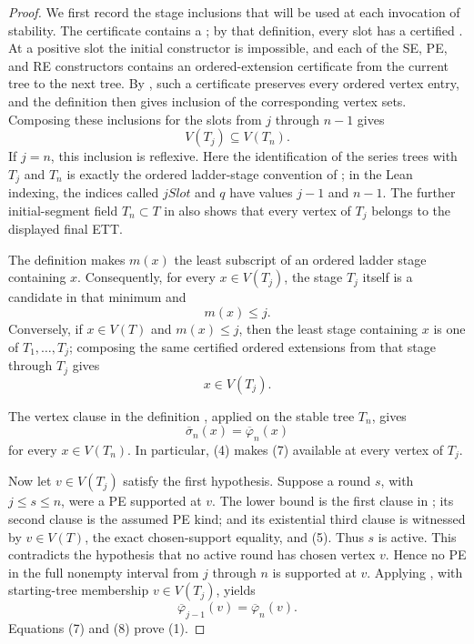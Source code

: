 \begin{proof}
We first record the stage inclusions that will be used at each invocation
of stability.  The certificate  contains a
; by that definition, every slot has a certified
.  At a positive slot the initial constructor
is impossible, and each of the SE, PE, and RE constructors contains an
ordered-extension certificate from the current tree to the next tree.
By , such a certificate preserves every
ordered vertex entry, and the definition 
then gives inclusion of the corresponding vertex sets.  Composing these
inclusions for the slots from \(j\) through \(n-1\) gives
\[
                         V(T_j)\subseteq V(T_n).                \tag{4}
\]
If \(j=n\), this inclusion is reflexive.  Here the identification of the
series trees with \(T_j\) and \(T_n\) is exactly the ordered ladder-stage
convention of ; in the Lean indexing,
the indices called \(jSlot\) and \(q\) have values \(j-1\) and \(n-1\).
The further initial-segment field \(T_n\subset T\) in
 also shows that every vertex of \(T_j\)
belongs to the displayed final ETT.

The definition  makes \(m(x)\) the least
subscript of an ordered ladder stage containing \(x\).  Consequently, for
every \(x\in V(T_j)\), the stage \(T_j\) itself is a candidate in that
minimum and
\[
                              m(x)\leq j.                       \tag{5}
\]
Conversely, if \(x\in V(T)\) and \(m(x)\leq j\), then the least stage
containing \(x\) is one of \(T_1,\ldots,T_j\); composing the same certified
ordered extensions from that stage through \(T_j\) gives
\[
                              x\in V(T_j).                      \tag{6}
\]

The vertex clause in the definition , applied on
the stable tree \(T_n\), gives
\[
                  \overline\sigma_n(x)=\overline\varphi_n(x)  \tag{7}
\]
for every \(x\in V(T_n)\).  In particular, (4) makes (7) available at
every vertex of \(T_j\).

Now let \(v\in V(T_j)\) satisfy the first hypothesis.  Suppose a round
\(s\), with \(j\leq s\leq n\), were a PE supported at \(v\).  The lower
bound is the first clause in ; its
second clause is the assumed PE kind; and its existential third clause is
witnessed by \(v\in V(T)\), the exact chosen-support equality, and (5).
Thus \(s\) is active.  This contradicts the hypothesis that no active
round has chosen vertex \(v\).  Hence no PE in the full nonempty interval
from \(j\) through \(n\) is supported at \(v\).  Applying
, with starting-tree membership
\(v\in V(T_j)\), yields
\[
                  \overline\varphi_{j-1}(v)
                    =\overline\varphi_n(v).                   \tag{8}
\]
Equations (7) and (8) prove (1).


\end{proof}
